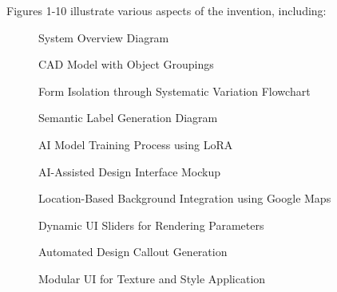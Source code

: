 \documentclass{article}
\begin{document}
Figures 1-10 illustrate various aspects of the invention, including:

\begin{figure}[H]
    \centering
    \caption{System Overview Diagram}
    \label{fig:system_overview}
\end{figure}

\begin{figure}[H]
    \centering
    \caption{CAD Model with Object Groupings}
    \label{fig:cad_model_groupings}
\end{figure}

\begin{figure}[H]
    \centering
    \caption{Form Isolation through Systematic Variation Flowchart}
    \label{fig:form_isolation_flowchart}
\end{figure}

\begin{figure}[H]
    \centering
    \caption{Semantic Label Generation Diagram}
    \label{fig:semantic_label_generation}
\end{figure}

\begin{figure}[H]
    \centering
    \caption{AI Model Training Process using LoRA}
    \label{fig:ai_model_training_lora}
\end{figure}

\begin{figure}[H]
    \centering
    \caption{AI-Assisted Design Interface Mockup}
    \label{fig:design_interface_mockup}
\end{figure}

\begin{figure}[H]
    \centering
    \caption{Location-Based Background Integration using Google Maps}
    \label{fig:location_based_background}
\end{figure}

\begin{figure}[H]
    \centering
    \caption{Dynamic UI Sliders for Rendering Parameters}
    \label{fig:dynamic_ui_sliders}
\end{figure}

\begin{figure}[H]
    \centering
    \caption{Automated Design Callout Generation}
    \label{fig:automated_design_callout}
\end{figure}

\begin{figure}[H]
    \centering
    \caption{Modular UI for Texture and Style Application}
    \label{fig:modular_ui_texture_style}
\end{figure}
\end{document}
